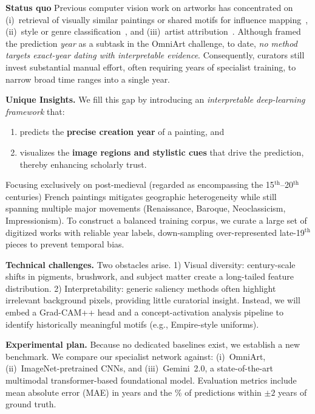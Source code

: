 \documentclass[10pt,twocolumn,letterpaper]{article}
\begin{document}
\smallskip
\noindent\textbf{Status quo}
Previous computer vision work on artworks has concentrated on (i)~retrieval of visually similar paintings or shared motifs for influence mapping~\cite{Seguin2016,Shen2019ArtMiner}, (ii)~style or genre classification~\cite{Karayev2014,Panda2023}, and (iii)~artist attribution~\cite{vanNoord2017}.  Although \cite{Strezoski2017} framed the prediction \emph{year} as a subtask in the OmniArt challenge, to date, \emph{no method targets exact-year dating with interpretable evidence}.  Consequently, curators still invest substantial manual effort, often requiring years of specialist training, to narrow broad time ranges into a single year.

\smallskip
\noindent\textbf{Unique Insights.}
We fill this gap by introducing an \emph{interpretable deep-learning framework} that:
\begin{enumerate}[leftmargin=1.2em,label=(\arabic*)]
    \item predicts the \textbf{precise creation year} of a painting, and
    \item visualizes the \textbf{image regions and stylistic cues}
          that drive the prediction, thereby enhancing scholarly trust.
\end{enumerate}
Focusing exclusively on post-medieval (regarded as encompassing the 15$^{\text{th}}$–20$^{\text{th}}$ centuries) French paintings mitigates geographic heterogeneity while still spanning multiple major movements (Renaissance, Baroque, Neoclassicism, Impressionism).  To construct a balanced training corpus, we curate a large set of digitized works with reliable year labels, down-sampling over-represented late-19$^{\text{th}}$ pieces to prevent temporal bias.

\smallskip
\noindent\textbf{Technical challenges.}
Two obstacles arise. 1) Visual diversity: century-scale shifts in pigments, brushwork, and subject matter create a long-tailed feature distribution. 2) Interpretability: generic saliency methods often highlight irrelevant background pixels, providing little curatorial insight. Instead, we will embed a Grad-CAM++ head and a concept-activation analysis pipeline to identify historically meaningful motifs (e.g., Empire-style uniforms)\cite{fumanalidocin2023}.

\smallskip
\noindent\textbf{Experimental plan.}
Because no dedicated baselines exist, we establish a new benchmark. We compare our specialist network against: (i)~OmniArt, (ii)~ImageNet-pretrained CNNs, and (iii)~Gemini~2.0, a state-of-the-art multimodal transformer-based foundational model. Evaluation metrics include mean absolute error (MAE) in years and the \% of predictions within $\pm2$ years of ground truth.
\end{document}
